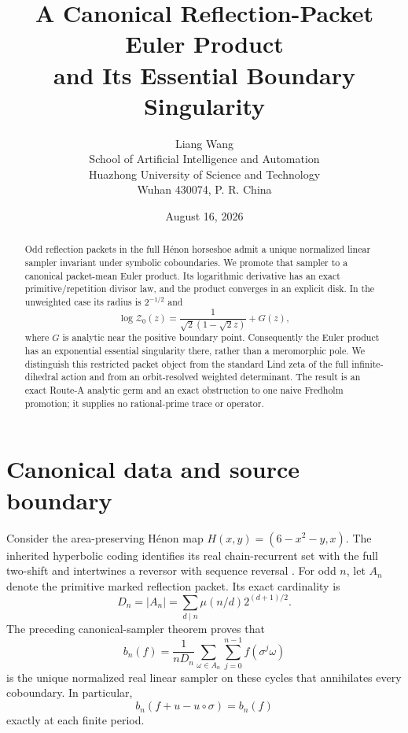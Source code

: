 \documentclass[11pt]{article}
\title{A Canonical Reflection-Packet Euler Product\\and Its Essential Boundary Singularity}
\author{Liang Wang\\\small School of Artificial Intelligence and Automation\\\small Huazhong University of Science and Technology\\\small Wuhan 430074, P. R. China}
\date{August 16, 2026}
\newcommand{\Zpack}{\mathcal Z}
\begin{document}
\maketitle

\begin{abstract}
Odd reflection packets in the full H\'enon horseshoe admit a unique normalized
linear sampler invariant under symbolic coboundaries.  We promote that sampler
to a canonical packet-mean Euler product.  Its logarithmic derivative has an
exact primitive/repetition divisor law, and the product converges in an
explicit disk.  In the unweighted case its radius is $2^{-1/2}$ and
\[
 \log\Zpack_0(z)
 =\frac{1}{\sqrt2(1-\sqrt2z)}+G(z),
\]
where $G$ is analytic near the positive boundary point.  Consequently the
Euler product has an exponential essential singularity there, rather than a
meromorphic pole.  We distinguish this restricted packet object from the
standard Lind zeta of the full infinite-dihedral action and from an
orbit-resolved weighted determinant.  The result is an exact Route-A analytic
germ and an exact obstruction to one naive Fredholm promotion; it supplies no
rational-prime trace or operator.
\end{abstract}

\section{Canonical data and source boundary}

Consider the area-preserving H\'enon map
$H(x,y)=(6-x^2-y,x)$.  The inherited hyperbolic coding identifies its real
chain-recurrent set with the full two-shift and intertwines a reversor with
sequence reversal \cite{DevaneyNitecki1979,Arai2007}.  For odd $n$, let $A_n$
denote the primitive marked reflection packet.  Its exact cardinality is
\begin{equation}\label{eq:Dn}
 D_n=|A_n|=\sum_{d\mid n}\mu(n/d)2^{(d+1)/2}.
\end{equation}
The preceding canonical-sampler theorem proves that
\begin{equation}\label{eq:bn}
 b_n(f)=\frac{1}{nD_n}\sum_{\omega\in A_n}\sum_{j=0}^{n-1}
 f(\sigma^j\omega)
\end{equation}
is the unique normalized real linear sampler on these cycles that annihilates
every coboundary.  In particular,
\begin{equation}\label{eq:gauge}
 b_n(f+u-u\circ\sigma)=b_n(f)
\end{equation}
exactly at each finite period.
\end{document}
